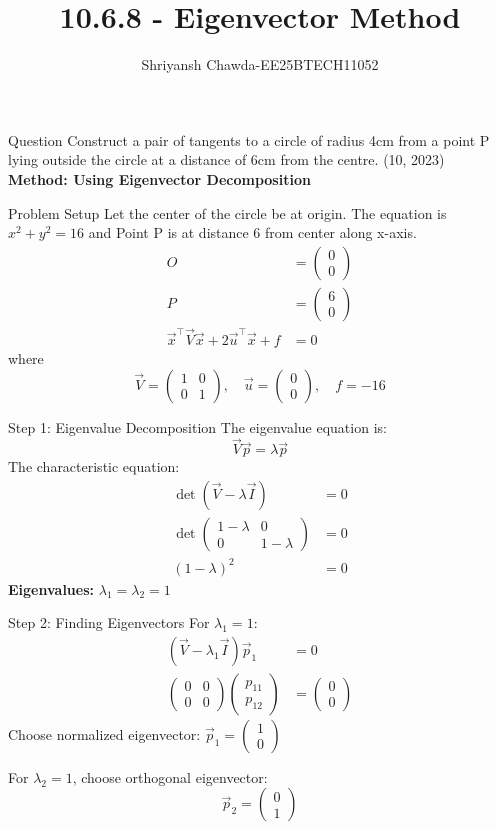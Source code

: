 \documentclass{beamer}
\title{10.6.8 - Eigenvector Method}
\author{Shriyansh Chawda-EE25BTECH11052}
\newcommand{\myvec}[1]{\ensuremath{\begin{pmatrix}#1\end{pmatrix}}}
\begin{document}
	
	\frame{\titlepage}
	
	\begin{frame}{Question} 
		Construct a pair of tangents to a circle of radius 4cm from a point P lying outside the circle at 
		a distance of 6cm from the centre.
		\hfill{(10, 2023)}\\
		\vspace{1em}
		\textbf{Method: Using Eigenvector Decomposition}
	\end{frame}
	
	\begin{frame}{Problem Setup}
		Let the center of the circle be at origin. The equation is $x^2 + y^2 = 16$ and Point P is at distance 6 from center along x-axis.
		\begin{align}
			O &= \myvec{0\\0}\\
			P &= \myvec{6\\0} \\
			\vec{x}^\top \vec{V} \vec{x} + 2\vec{u}^\top \vec{x} + f &= 0
		\end{align}
		where
		\begin{equation}
			\vec{V} = \myvec{1 & 0\\0 & 1}, \quad \vec{u} = \myvec{0\\0}, \quad f = -16
		\end{equation}
	\end{frame}
	
	\begin{frame}{Step 1: Eigenvalue Decomposition}
		The eigenvalue equation is:
		\begin{equation}
			\vec{V}\vec{p} = \lambda\vec{p}
		\end{equation}
		The characteristic equation:
		\begin{align}
			\det(\vec{V} - \lambda\vec{I}) &= 0\\
			\det\myvec{1-\lambda & 0\\0 & 1-\lambda} &= 0\\
			(1-\lambda)^2 &= 0
		\end{align}
		\textbf{Eigenvalues:} $\lambda_1 = \lambda_2 = 1$
	\end{frame}
	
	\begin{frame}{Step 2: Finding Eigenvectors}
		For $\lambda_1 = 1$:
		\begin{align}
			(\vec{V} - \lambda_1\vec{I})\vec{p}_1 &= 0\\
			\myvec{0 & 0\\0 & 0}\myvec{p_{11}\\p_{12}} &= \myvec{0\\0}
		\end{align}
		Choose normalized eigenvector: $\vec{p}_1 = \myvec{1\\0}$
		
		\vspace{1em}
		For $\lambda_2 = 1$, choose orthogonal eigenvector:
		\begin{equation}
			\vec{p}_2 = \myvec{0\\1}
		\end{equation}
	\end{frame}
	
\end{document}

